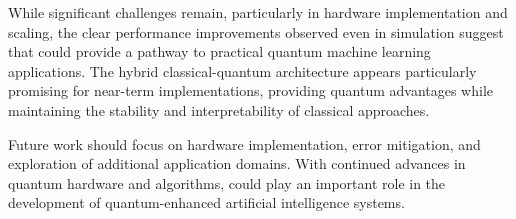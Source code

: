 While significant challenges remain, particularly in hardware implementation and scaling, the clear performance improvements observed even in simulation suggest that \qmnn could provide a pathway to practical quantum machine learning applications. The hybrid classical-quantum architecture appears particularly promising for near-term implementations, providing quantum advantages while maintaining the stability and interpretability of classical approaches.

Future work should focus on hardware implementation, error mitigation, and exploration of additional application domains. With continued advances in quantum hardware and algorithms, \qmnn could play an important role in the development of quantum-enhanced artificial intelligence systems.
